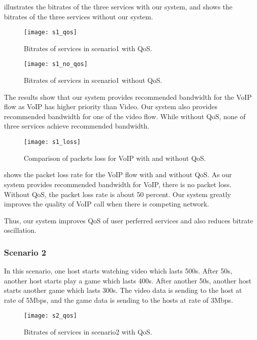  illustrates the bitrates of the three services with our system, and  shows the bitrates of the three services without our system. 

\begin{figure}[htb]
\centering
\texttt{[image: s1\_qos]}
\caption{Bitrates of services in scenario1 with QoS.}
\label{fig:s1_qos}
\end{figure}


\begin{figure}[htb]
\centering
\texttt{[image: s1\_no\_qos]}
\caption{Bitrates of services in scenario1 without QoS.}
\label{fig:s1_no_qos}
\end{figure}

The results show that our system provides recommended bandwidth for the VoIP flow as VoIP has higher priority than Video. 
Our system also provides recommended bandwidth for one of the video flow. While without QoS, none of three services achieve recommended bandwidth.

\begin{figure}[htb]
\centering
\texttt{[image: s1\_loss]}
\caption{Comparison of packets loss for VoIP with and without QoS.}
\label{fig:s1_loss}
\end{figure}

 shows the packet loss rate for the VoIP flow with and without QoS. As our system provides recommended bandwidth for VoIP, there is no packet loss. Without QoS, the packet loss rate is about 50 percent. Our system greatly improves the quality of VoIP call when there is competing network.

Thus, our system improves QoS of user perferred services and also reduces bitrate oscillation. 

\subsubsection{Scenario 2}
In this scenario, one host starts watching video which lasts 500s. After 50s, another host starts play a game which lasts 400s. After another 50s, another host starts another game which lasts 300s.
The video data is sending to the host at rate of 5Mbps, and the game data is sending to the hosts at rate of 3Mbps.

\begin{figure}[htb]
\centering
\texttt{[image: s2\_qos]}
\caption{Bitrates of services in scenario2 with QoS.}
\label{fig:s2_qos}
\end{figure}

